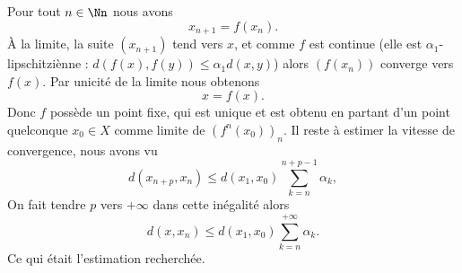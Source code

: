 {{Pour tout $n\in \Nn$ nous avons
$$x_{n+1}=f(x_n).$$
\`A la limite, la suite $(x_{n+1})$ tend vers $x$, et comme $f$ est continue
(elle est $\alpha_1$-lipschitziènne : $d(f(x),f(y)) \le \alpha_1 d(x,y)$) alors
$(f(x_n))$  converge vers $f(x)$. Par unicité de la limite nous obtenons
$$x=f(x).$$
Donc $f$ possède un point fixe, qui est unique et est obtenu en partant d'un point quelconque $x_0\in X$ comme limite de $(f^n(x_0))_n$.
Il reste à estimer la vitesse de convergence, nous avons vu
$$ d(x_{n+p},x_n) \le d(x_{1},x_{0})\sum_{k=n}^{n+p-1} \alpha_k,$$
On fait tendre $p$ vers $+\infty$ dans cette inégalité alors
$$ d(x,x_n) \le d(x_{1},x_{0})\sum_{k=n}^{+\infty} \alpha_k.$$
Ce qui était l'estimation recherchée.
}
}
